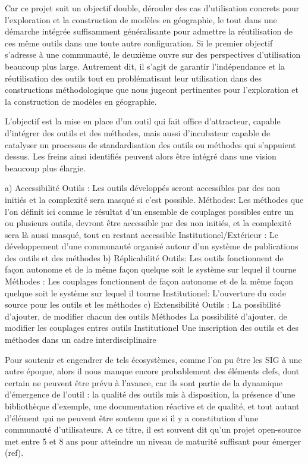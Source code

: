 Car ce projet suit un objectif double, dérouler des cas d'utilisation concrets pour l'exploration et la construction de modèles en géographie, le tout dans une démarche intégrée suffisamment généralisante pour admettre la réutilisation de ces même outils dans une toute autre configuration. Si le premier objectif s'adresse à une communauté, le deuxième ouvre sur des perspectives d'utilisation beaucoup plus large. Autrement dit, il s'agit de garantir l'indépendance et la réutilisation des outils tout en problématisant leur utilisation dans des constructions méthodologique que nous jugeont pertinentes pour l'exploration et la construction de modèles en géographie.

L'objectif est la mise en place d'un outil qui fait office d'attracteur,  capable d'intégrer des outils et des méthodes, mais aussi d'incubateur capable de catalyser un processus de standardisation des outils ou méthodes qui s'appuient dessus. Les freins ainsi identifiés peuvent alors être intégré dans une vision beaucoup plus élargie.

a) Accessibilité 
		Outils : 
			Les outils développés seront accessibles par des non initiés et la complexité sera masqué si c'est possible.
		Méthodes:
			Les méthodes que l'on définit ici comme le résultat d'un ensemble de couplages possibles entre un ou plusieurs outils,  devront être accessible par des non initiés, et la complexité sera là aussi masqué, tout en restant accessible
		Institutionel/Extérieur :
			Le développement d'une communauté organisé autour d'un système de publications des outils et des méthodes 
b) Réplicabilité 
	Outils:
		Les outils  fonctionnent de façon autonome et de la même façon quelque soit le système sur lequel il tourne
	Méthodes :
		Les couplages fonctionnent de façon autonome et de la même façon quelque soit le système sur lequel il tourne
	Institutionel: 
	 	L'ouverture du code source pour les outils et les méthodes
c) Extensibilité 
	Outils : 
		La possibilité d'ajouter, de modifier chacun des outils
	Méthodes
		La possibilité d'ajouter, de modifier les couplages entres outils
	Institutionel
		Une inscription des outils et des méthodes dans un cadre interdisciplinaire

 Pour soutenir et engendrer de tels écosystèmes, comme l'on pu être les SIG à une autre époque, alors il nous manque encore probablement des éléments clefs, dont certain ne peuvent être prévu à l'avance, car ils sont partie de la dynamique d'émergence de l'outil : la qualité des outils mis à disposition, la présence d'une bibliothèque d'exemple, une documentation réactive et de qualité, et tout autant d'élément qui ne peuvent être soutenu que si il y a constitution d'une communauté d'utilisateurs. A ce titre, il est souvent dit qu'un projet open-source met entre 5 et 8 ans pour atteindre un niveau de maturité suffisant pour émerger (ref).  
 
